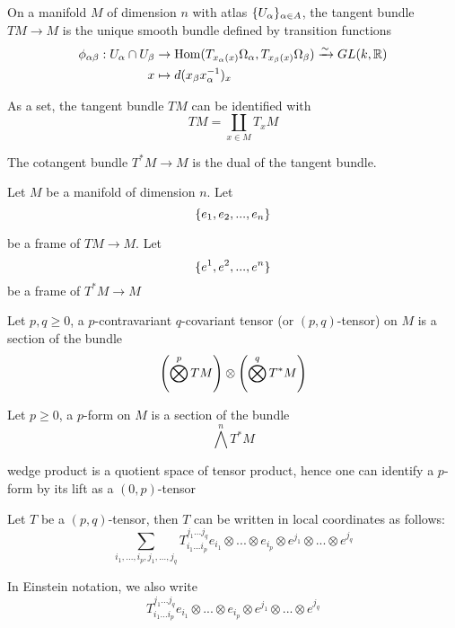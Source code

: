 \begin{definition}
	On a manifold $M$ of dimension $n$ with atlas $\set{U_\alpha}_{\alpha \in A}$, the tangent bundle $TM \to M$ is the unique smooth bundle defined by transition functions
	\begin{align*}
		\phi_{\alpha \beta}: U_\alpha \cap U_\beta &\to \Hom(T_{x_\alpha(x)} \Omega_\alpha, T_{x_\beta(x)} \Omega_\beta) \xrightarrow{\sim} GL(k, \R) \\
		x &\mapsto d(x_\beta x_\alpha^{-1})_x
	\end{align*}
	
	As a set, the tangent bundle $TM$ can be identified with
	$$
		TM = \coprod_{x \in M} T_x M
	$$
	
	The cotangent bundle $T^*M \to M$ is the dual of the tangent bundle.
\end{definition}

\begin{remark}
	Let $M$ be a manifold of dimension $n$. Let
	$$
		\set{e_1, e_2, ..., e_n}
	$$
	
	be a frame of $TM \to M$. Let
	$$
		\set{e^1, e^2, ..., e^n}
	$$
	be a frame of $T^*M \to M$
\end{remark}

\begin{definition}[tensor]
	Let $p, q \geq 0$, a $p$-contravariant $q$-covariant tensor (or $(p, q)$-tensor) on $M$ is a section of the bundle
	$$
		\tuple*{\bigotimes^p TM} \otimes \tuple*{\bigotimes^q T^*M}
	$$
\end{definition}

\begin{definition}
	Let $p \geq 0$, a $p$-form on $M$ is a section of the bundle
	$$
		\bigwedge^n T^* M
	$$
\end{definition}

\begin{remark}
	wedge product is a quotient space of tensor product, hence one can identify a $p$-form by its lift as a $(0, p)$-tensor
\end{remark}

\begin{remark}
	Let $T$ be a $(p, q)$-tensor, then $T$ can be written in local coordinates as follows:
	$$
		\sum_{i_1, ..., i_p, j_1, ..., j_q} T_{i_1 ... i_p}^{j_1 ... j_q} e_{i_1} \otimes ... \otimes e_{i_p} \otimes e^{j_1} \otimes ... \otimes e^{j_q}
	$$
	
	In Einstein notation, we also write
	$$
		T_{i_1 ... i_p}^{j_1 ... j_q} e_{i_1} \otimes ... \otimes e_{i_p} \otimes e^{j_1} \otimes ... \otimes e^{j_q}
	$$
\end{remark}

